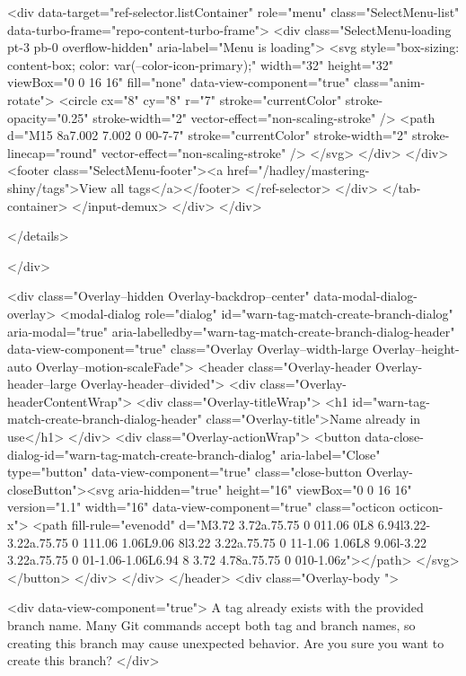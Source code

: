            <div data-target="ref-selector.listContainer" role="menu" class="SelectMenu-list" data-turbo-frame="repo-content-turbo-frame">
              <div class="SelectMenu-loading pt-3 pb-0 overflow-hidden" aria-label="Menu is loading">
                <svg style="box-sizing: content-box; color: var(--color-icon-primary);" width="32" height="32" viewBox="0 0 16 16" fill="none" data-view-component="true" class="anim-rotate">
  <circle cx="8" cy="8" r="7" stroke="currentColor" stroke-opacity="0.25" stroke-width="2" vector-effect="non-scaling-stroke" />
  <path d="M15 8a7.002 7.002 0 00-7-7" stroke="currentColor" stroke-width="2" stroke-linecap="round" vector-effect="non-scaling-stroke" />
</svg>
              </div>
            </div>
              <footer class="SelectMenu-footer"><a href="/hadley/mastering-shiny/tags">View all tags</a></footer>
          </ref-selector>
        </div>
      </tab-container>
    </input-demux>
  </div>
</div>

  </details>

</div>


<div class="Overlay--hidden Overlay-backdrop--center" data-modal-dialog-overlay>
  <modal-dialog role="dialog" id="warn-tag-match-create-branch-dialog" aria-modal="true" aria-labelledby="warn-tag-match-create-branch-dialog-header" data-view-component="true" class="Overlay Overlay--width-large Overlay--height-auto Overlay--motion-scaleFade">
      <header class="Overlay-header Overlay-header--large Overlay-header--divided">
        <div class="Overlay-headerContentWrap">
          <div class="Overlay-titleWrap">
            <h1 id="warn-tag-match-create-branch-dialog-header" class="Overlay-title">Name already in use</h1>
          </div>
          <div class="Overlay-actionWrap">
            <button data-close-dialog-id="warn-tag-match-create-branch-dialog" aria-label="Close" type="button" data-view-component="true" class="close-button Overlay-closeButton"><svg aria-hidden="true" height="16" viewBox="0 0 16 16" version="1.1" width="16" data-view-component="true" class="octicon octicon-x">
    <path fill-rule="evenodd" d="M3.72 3.72a.75.75 0 011.06 0L8 6.94l3.22-3.22a.75.75 0 111.06 1.06L9.06 8l3.22 3.22a.75.75 0 11-1.06 1.06L8 9.06l-3.22 3.22a.75.75 0 01-1.06-1.06L6.94 8 3.72 4.78a.75.75 0 010-1.06z"></path>
</svg></button>
          </div>
        </div>
      </header>
    <div class="Overlay-body ">
      
          <div data-view-component="true">      A tag already exists with the provided branch name. Many Git commands accept both tag and branch names, so creating this branch may cause unexpected behavior. Are you sure you want to create this branch?
</div>

